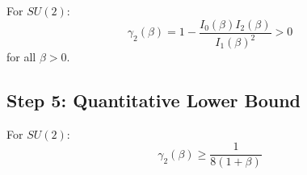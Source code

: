 \begin{corollary}
\label{cor:su2-gap-bound}
For $SU(2)$:
\begin{equation}
\gamma_2(\beta) = 1 - \frac{I_0(\beta) I_2(\beta)}{I_1(\beta)^2} > 0
\end{equation}
for all $\beta > 0$.
\end{corollary}

\subsection{Step 5: Quantitative Lower Bound}

\begin{theorem}
\label{thm:su2-explicit}
For $SU(2)$:
\begin{equation}
\gamma_2(\beta) \geq \frac{1}{8(1 + \beta)}
\end{equation}
\end{theorem}

